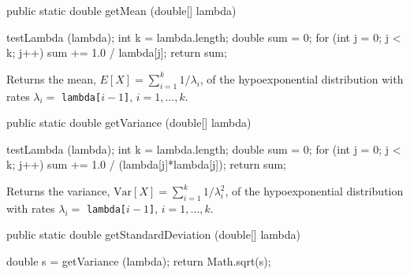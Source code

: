 \begin{htmlonly}
\end{htmlonly}
\begin{code}

   public static double getMean (double[] lambda)\begin{hide} {
      testLambda (lambda);
      int k = lambda.length;
      double sum = 0;
      for (int j = 0; j < k; j++)
         sum += 1.0 / lambda[j];
      return sum;
   }\end{hide}
\end{code}
\begin{tabb} Returns the mean, $E[X] = \sum_{i=1}^k 1/\lambda_i$,
   of the hypoexponential distribution with rates $\lambda_i = $
\texttt{lambda[$i-1$]}, $i = 1,\ldots,k$.
\end{tabb}
\begin{htmlonly}
\end{htmlonly}
\begin{code}

   public static double getVariance (double[] lambda)\begin{hide} {
      testLambda (lambda);
      int k = lambda.length;
      double sum = 0;
      for (int j = 0; j < k; j++)
         sum += 1.0 / (lambda[j]*lambda[j]);
      return sum;
   }\end{hide}
\end{code}
\begin{tabb}  Returns the variance,
$\mbox{Var}[X] = \sum_{i=1}^k 1/\lambda_i^2$,
of the hypoexponential distribution with rates $\lambda_i = $
\texttt{lambda[$i-1$]}, $i = 1,\ldots,k$.
\end{tabb}
\begin{htmlonly}
\end{htmlonly}
\begin{code}

   public static double getStandardDeviation (double[] lambda)\begin{hide} {
      double s = getVariance (lambda);
      return Math.sqrt(s);
   }\end{hide}
\end{code}
